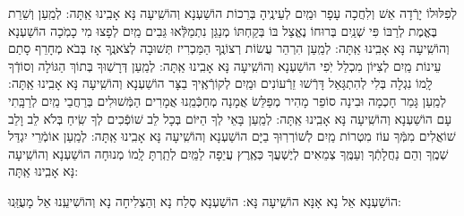 \documentclass[twoside, openany, parskip=half, 11pt]{book}
\begin{document}
\begin{small}
	לְפִלּוּלוֹ יָרְֿדָה אֵשׁ וְלִחֲכָה עָפָר וּמַֽיִם לְעֵינֶֽיהָ בְּרֵכוֹת 	הוֹשַׁעְנָא וְהוֹשִֽׁיעָה נָּא אָבִֽינוּ אַֽתָּה:
לְמַֽעַן וְשֵׁרֵת בֶּאֱמֶת לְרַבּוֹ פִּי שְׁנַֽיִם בְּרוּחוֹ נֶאֱצַל בּוֹ 
	בְּקַחְתּוֹ מְנַגֵּן נִתְמַלְּֿאוּ גֵּבִים מַֽיִם לְפָצוּ מִי כָמֹֽכָה 	הוֹשַׁעְנָא וְהוֹשִֽׁיעָה נָּא אָבִֽינוּ אַֽתָּה:
לְמַֽעַן הִרְהֵר עֲשׂוֹת רְצוֹנֶֽךָ הַמַּכְרִיז תְּשׁוּבָה לְצֹאנֶֽךָ 
	אָז בְּבֹא מְחָרֵף סָתַם עֵינוֹת מַֽיִם לְצִיּוֹן מִכְלַל יֹֽפִי 	הוֹשַׁעְנָא וְהוֹשִֽׁיעָה נָּא אָבִֽינוּ אַֽתָּה:
לְמַֽעַן דְּרָשֽׁוּךָ בְּתוֹךְ הַגּוֹלָה וְסוֹדְֿךָ לָֽמוֹ נִגְלָה 
	בְּלִי לְהִתְגָּאֵל דָּרְֿשׁוּ זֵרְֿעוֹנִים וּמַֽיִם לְקוֹרְֿאֶֽיךָ בַצָּר 	הוֹשַׁעְנָא וְהוֹשִֽׁיעָה נָּא אָבִֽינוּ אַֽתָּה:
לְמַֽעַן גָּמַר חָכְמָה וּבִינָה סוֹפֵר מָהִיר מְפַלֵּשׂ אֲמָנָה 
	מְחַכְּֿמֵֽנוּ אֲמָרִים הַמְּֿשׁוּלִים בְּרַחֲבֵי מַֽיִם לְרַבָּֽתִי עָם 	הוֹשַׁעְנָא וְהוֹשִֽׁיעָה נָּא אָבִֽינוּ אַֽתָּה:
לְמַֽעַן בָּאֵי לְךָ הַיּוֹם בְּכָל לֵב שׁוֹפְֿכִים לְךָ שִֽׂיחַ בְּלֹא לֵב וָלֵב 
	שׁוֹאֲלִים מִמְּֿךָ עוֹז מִטְרוֹת מַֽיִם לְשׁוֹרְרֽוּךָ בַיָּם 	הוֹשַׁעְנָא וְהוֹשִֽׁיעָה נָּא אָבִֽינוּ אַֽתָּה:
לְמַֽעַן אוֹמְֿרֵי יִגְדַּל שְׁמֶֽךָ וְהֵם נַחֲלָתְֿךָ וְעַמֶּֽךָ 
	צְמֵאִים לְיֶשְׁעֲךָ כְּאֶֽרֶץ עֲיֵפָה לַמַּֽיִם לְתַֽרְתָּ לָֽמוֹ מְנוּחָה 	הוֹשַׁעְנָא וְהוֹשִֽׁיעָה נָּא אָבִֽינוּ אַֽתָּה:
	
\end{small}

\begin{large}
 הוֹשַׁעְנָא אֵל נָא אָנָּא הוֹשִֽׁיעָה נָּא:
הוֹשַׁעְנָא סְלַח נָא וְהַצְלִיחָה נָא וְהוֹשִׁיעֵֽנוּ אֵל מָעֻזֵּֽנוּ:

\end{large}
\end{document}
